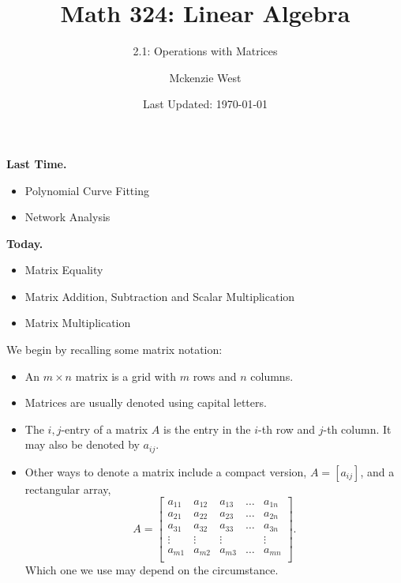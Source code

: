 \documentclass[handout]{beamer}
\theoremstyle{definition}
\begin{document}
	\title{Math 324: Linear Algebra}
	\subtitle{2.1: Operations with Matrices}
	\author{Mckenzie West}
	\date{Last Updated: \today}
\begin{frame}
\maketitle
\end{frame}

\begin{frame}{\insertframenumber}
	\begin{block}{\textbf{Last Time.}}
	\begin{itemize}[label=--]
		\item Polynomial Curve Fitting
		\item Network Analysis
	\end{itemize}
	\end{block}
\begin{block}{\textbf{Today.}}
	\begin{itemize}[label=--]
		\item Matrix Equality
		\item Matrix Addition, Subtraction and Scalar Multiplication
		\item Matrix Multiplication
	\end{itemize}
\end{block}
\end{frame}

\begin{frame}{\insertframenumber}
	We begin by recalling some matrix notation:
		\begin{itemize}[label=--]
			\item An $m\times n$ matrix is a grid with $m$ rows and $n$ columns.
			\item Matrices are usually denoted using capital letters.
			\item The $i,j$-entry of a matrix $A$ is the entry in the $i$-th row and $j$-th column.  It may also be denoted by $a_{ij}$.
			\item Other ways to denote a matrix include a compact version, $A=[a_{ij}]$, and a rectangular array,
				\[A=\begin{bmatrix}
				a_{11}&a_{12}&a_{13}&\dots&a_{1n}\\
				a_{21}&a_{22}&a_{23}&\dots&a_{2n}\\
				a_{31}&a_{32}&a_{33}&\dots&a_{3n}\\
				\vdots&\vdots&\vdots&&\vdots\\
				a_{m1}&a_{m2}&a_{m3}&\dots&a_{mn}\\
				\end{bmatrix}.\]
			Which one we use may depend on the circumstance.
		\end{itemize}
\end{frame}
\end{document}
